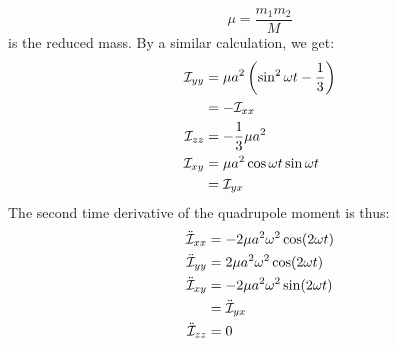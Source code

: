 \begin{equation}
\label{eqn:reduced_mass}
\mu = \frac{m_1 m_2}{M}
\end{equation}
is the reduced mass. By a similar calculation, we get:
\begin{align}
\mathcal{I}_{yy} &= \mu a^2 \left(\sin^2 \omega t - \frac{1}{3}\right) \\
         &= -\mathcal{I}_{xx} \\
\mathcal{I}_{zz} &= -\frac{1}{3} \mu a^2 \\
\mathcal{I}_{xy} &= \mu a^2 \cos \omega t \sin \omega t \\
         &= \mathcal{I}_{yx}
\end{align}
The second time derivative of the quadrupole moment is thus:
\begin{subequations}
\begin{align}
\ddot{\mathcal{I}}_{xx} &=  -2\mu a^2\omega^2 \cos(2\omega t) \\
\ddot{\mathcal{I}}_{yy} &=  2\mu a^2\omega^2 \cos(2\omega t)  \\
\ddot{\mathcal{I}}_{xy} &=  -2 \mu a^2 \omega^2 \sin(2 \omega t) \\
                &=  \ddot{\mathcal{I}}_{yx} \\
\ddot{\mathcal{I}}_{zz} &=  0
\end{align}
\label{eqn:second_deriv_qm}
\end{subequations}

